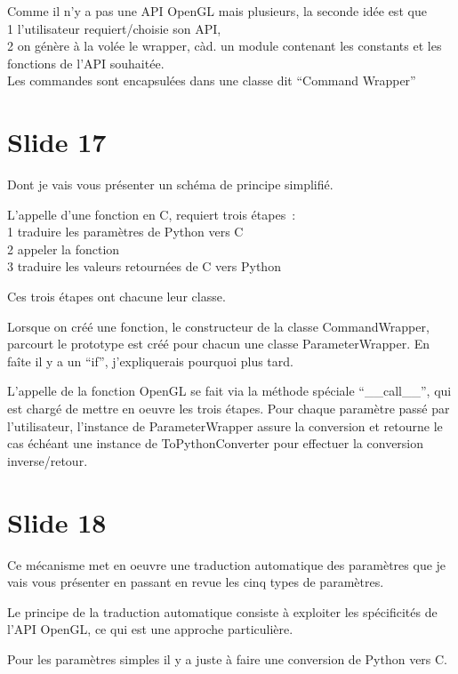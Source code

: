 \documentclass[12pt]{article}
\begin{document}
Comme il n'y a pas une API OpenGL mais plusieurs, la seconde idée est que \\
  1 l'utilisateur requiert/choisie son API, \\
  2 on génère à la volée le wrapper, càd. un module contenant les constants et les fonctions de l'API souhaitée. \\

Les commandes sont encapsulées dans une classe dit ``Command Wrapper'' 

\section{Slide 17}

Dont je vais vous présenter un schéma de principe simplifié.

L'appelle d'une fonction en C, requiert trois étapes~: \\
 1 traduire les paramètres de Python vers C \\
 2 appeler la fonction \\
 3 traduire les valeurs retournées de C vers Python

Ces trois étapes ont chacune leur classe.

Lorsque on créé une fonction, le constructeur de la classe CommandWrapper, parcourt le prototype est
créé pour chacun une classe ParameterWrapper. En faîte il y a un ``if'', j'expliquerais pourquoi
plus tard.

L'appelle de la fonction OpenGL se fait via la méthode spéciale ``\_\_call\_\_'', qui est chargé de
mettre en oeuvre les trois étapes. Pour chaque paramètre passé par l'utilisateur, l'instance de
ParameterWrapper assure la conversion et retourne le cas échéant une instance de ToPythonConverter
pour effectuer la conversion inverse/retour. 

\section{Slide 18}

Ce mécanisme met en oeuvre une traduction automatique des paramètres que je vais vous présenter en
passant en revue les cinq types de paramètres.

Le principe de la traduction automatique consiste à exploiter les spécificités de l'API OpenGL, ce
qui est une approche particulière.

Pour les paramètres simples il y a juste à faire une conversion de Python vers C.
\end{document}
